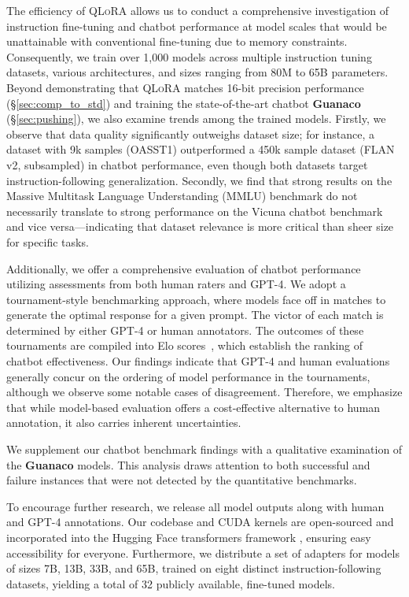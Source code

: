 The efficiency of \textsc{QLoRA} allows us to conduct a comprehensive investigation of instruction fine-tuning and chatbot performance at model scales that would be unattainable with conventional fine-tuning due to memory constraints. Consequently, we train over 1,000 models across multiple instruction tuning datasets, various architectures, and sizes ranging from 80M to 65B parameters. Beyond demonstrating that \textsc{QLoRA} matches 16-bit precision performance (\S\ref{sec:comp_to_std}) and training the state-of-the-art chatbot \textbf{Guanaco} (\S\ref{sec:pushing}), we also examine trends among the trained models. Firstly, we observe that data quality significantly outweighs dataset size; for instance, a dataset with 9k samples (OASST1) outperformed a 450k sample dataset (FLAN v2, subsampled) in chatbot performance, even though both datasets target instruction-following generalization. Secondly, we find that strong results on the Massive Multitask Language Understanding (MMLU) benchmark do not necessarily translate to strong performance on the Vicuna chatbot benchmark and vice versa—indicating that dataset relevance is more critical than sheer size for specific tasks.

Additionally, we offer a comprehensive evaluation of chatbot performance utilizing assessments from both human raters and GPT-4. We adopt a tournament-style benchmarking approach, where models face off in matches to generate the optimal response for a given prompt. The victor of each match is determined by either GPT-4 or human annotators. The outcomes of these tournaments are compiled into Elo scores~\citep{elo1967proposed, elo1978rating}, which establish the ranking of chatbot effectiveness. Our findings indicate that GPT-4 and human evaluations generally concur on the ordering of model performance in the tournaments, although we observe some notable cases of disagreement. Therefore, we emphasize that while model-based evaluation offers a cost-effective alternative to human annotation, it also carries inherent uncertainties.

We supplement our chatbot benchmark findings with a qualitative examination of the \textbf{Guanaco} models. This analysis draws attention to both successful and failure instances that were not detected by the quantitative benchmarks.

To encourage further research, we release all model outputs along with human and GPT-4 annotations. Our codebase and CUDA kernels are open-sourced and incorporated into the Hugging Face transformers framework \citep{wolf2019huggingface}, ensuring easy accessibility for everyone. Furthermore, we distribute a set of adapters for models of sizes 7B, 13B, 33B, and 65B, trained on eight distinct instruction-following datasets, yielding a total of 32 publicly available, fine-tuned models.

